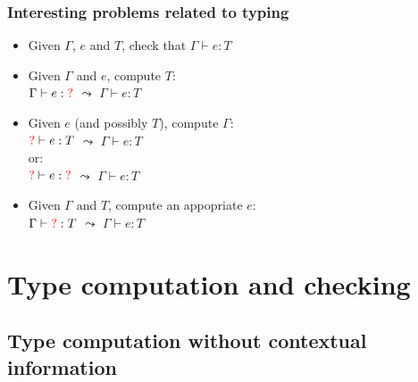 \documentclass{beamer}
\begin{document}
\begin{frame}[fragile]\frametitle{Interesting problems related to typing}

  \begin{itemize}
  \item {} Given $\Gamma$, $e$ and $T$, check that $\Gamma \vdash e : T$

  \item {} Given $\Gamma$ and $e$, compute $T$:\\
    $\Gamma \vdash e : {\color{red}?}$ \hspace{4mm} $\leadsto$ \hspace{4mm} $\Gamma \vdash e : T$

    
  \item {} Given $e$ (and possibly $T$), compute $\Gamma$:\\
    ${\color{red}?} \vdash e : T$ \hspace{4mm} $\leadsto$ \hspace{4mm} $\Gamma \vdash e : T$\\
    or:\\
    ${\color{red}?} \vdash e : {\color{red}?}$ \hspace{4mm} $\leadsto$ \hspace{4mm} $\Gamma \vdash e : T$

  \item {} Given $\Gamma$ and $T$, compute an appopriate $e$:\\
    $\Gamma \vdash {\color{red}?} : T$ \hspace{4mm} $\leadsto$ \hspace{4mm} $\Gamma \vdash e : T$
  \end{itemize}

\end{frame}


\section{Type computation and checking}

\subsection{Type computation without contextual information}
\end{document}
